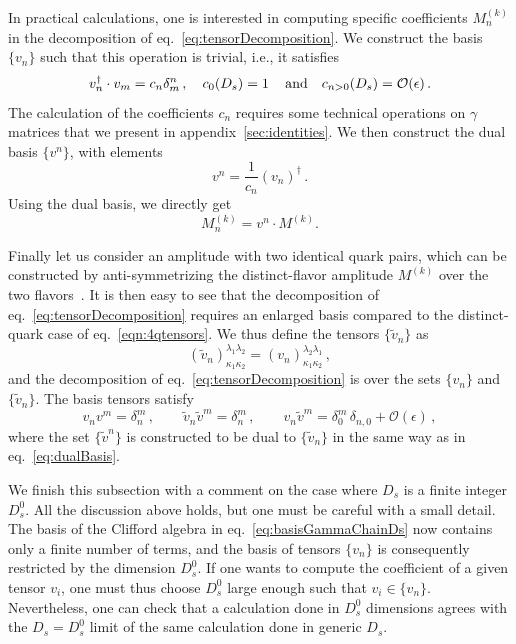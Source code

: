 In practical calculations, one is interested in computing
specific coefficients $M^{(k)}_n$ in the decomposition
of eq.~\eqref{eq:tensorDecomposition}. We construct the
basis $\{v_n\}$ such that this operation is trivial, i.e., it
satisfies
\begin{equation}\label{eqn:vnproducts}
	v_n^\dagger\cdot v_m=c_n\delta^n_m\,,
	\quad
    c_0(D_s) = 1\,\quad\mbox{and}\quad  c_{n>0}(D_s)={\cal O}(\epsilon)\,.
\end{equation}
The calculation of the coefficients $c_n$ requires some 
technical operations on $\gamma$ matrices that we present in
appendix~\ref{sec:identities}.
We then construct the dual basis $\{v^n\}$, with elements
\begin{equation}\label{eq:dualBasis}
	v^n=\frac{1}{c_n} (v_n)^\dagger\,.
\end{equation}
Using the dual basis, we directly get
\begin{equation}\label{eqn:helampl}
  M^{(k)}_n = v^n \cdot M^{(k)}.
\end{equation}

Finally let us consider an amplitude with two identical quark
pairs, which can be constructed by anti-symmetrizing the
distinct-flavor amplitude $M^{(k)}$ over the two
flavors~\cite{DeFreitas:2004kmi,Glover:2004si}.
It is then easy to see that the decomposition of
eq.~\eqref{eq:tensorDecomposition} requires an enlarged basis
compared to the distinct-quark case of
eq.~\eqref{eqn:4qtensors}. We thus define the tensors
$\{\tilde v_n\}$ as
\begin{equation}\label{eq:basisIdentical}
	(\tilde v_n)_{\kappa_1\kappa_2}^{\lambda_1\lambda_2}=
	(v_n)_{\kappa_1\kappa_2}^{\lambda_2\lambda_1}\,,
\end{equation}
and the decomposition of eq.~\eqref{eq:tensorDecomposition}
is over the sets $\{v_n\}$ and $\{\tilde v_n\}$.
The basis tensors satisfy
\begin{equation}\label{eq:dualBasisIdentical}
	v_nv^m=\delta^m_n\,,\qquad
	\tilde v_n\tilde v^m=\delta^m_n\,,\qquad
	v_n\tilde v^m=
	\delta^m_0\,\delta_{n,0}+\mathcal{O}(\epsilon)\,,
\end{equation}
where the set $\{\tilde v^n\}$ is constructed to be dual to
$\{\tilde v_n\}$ in the same way as in 
eq.~\eqref{eq:dualBasis}.

We finish this subsection with a comment on the case where $D_s$
is a finite integer $D_s^0$. 
All the discussion above holds, but one
must be careful with a small detail. 
The basis of the Clifford algebra in 
eq.~\eqref{eq:basisGammaChainDs} now contains only a finite 
number of terms, and the basis of tensors $\{v_n\}$ is
consequently restricted by the dimension $D^0_s$. 
If one wants to compute the coefficient of a given tensor 
$v_i$, one must thus choose $D_s^0$ large enough such
that $v_i \in \{v_n\}$. Nevertheless, one can check that a 
calculation done in $D_s^0$ dimensions agrees 
with the $D_s=D_s^0$ limit of the same calculation done in
generic $D_s$.


